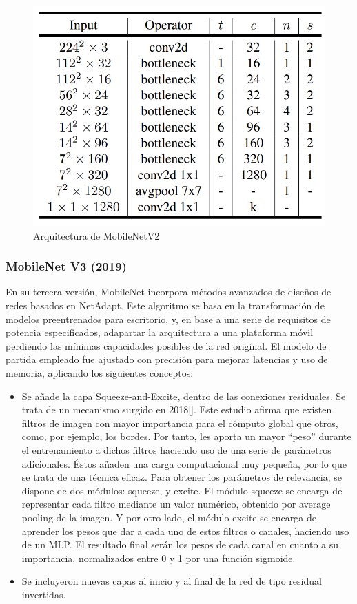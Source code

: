     \begin{figure}[H]
	\label{mv2}
	\centering
	\includegraphics[scale = 0.25]{imagenes/mobilenetv2.png}
	\caption{Arquitectura de MobileNetV2}
\end{figure}

\subsubsection{MobileNet V3 (2019)}

En su tercera versión\cite{howard2019searching}, MobileNet incorpora métodos avanzados de diseños de redes basados en NetAdapt. Este algoritmo se basa en la transformación de modelos preentrenados para escritorio, y, en base a una serie de requisitos de potencia especificados, adapartar la arquitectura a una plataforma móvil perdiendo las mínimas capacidades posibles de la red original.  El modelo de partida empleado fue ajustado con precisión para mejorar latencias y uso de memoria, aplicando los siguientes conceptos:

\begin{itemize}
    \item Se añade la capa Squeeze-and-Excite, dentro de las conexiones residuales. Se trata de un mecanismo surgido en 2018[]. Este estudio afirma que existen filtros de imagen con mayor importancia para el cómputo global que otros, como, por ejemplo, los bordes. Por tanto, les aporta un mayor ``peso'' durante el entrenamiento a dichos filtros haciendo uso de una serie de parámetros adicionales. Éstos añaden una carga computacional muy pequeña, por lo que se trata de una técnica eficaz. Para obtener los parámetros de relevancia, se dispone de dos módulos: squeeze, y excite. El módulo squeeze se encarga de representar cada filtro mediante un valor numérico, obtenido por average pooling de la imagen. Y por otro lado, el módulo excite se encarga de aprender los pesos que dar a cada uno de estos filtros o canales, haciendo uso de un MLP. El resultado final serán los pesos de cada canal en cuanto a su importancia, normalizados entre 0 y 1 por una función sigmoide.

    \item Se incluyeron nuevas capas al inicio y al final de la red de tipo residual invertidas.
\end{itemize}

